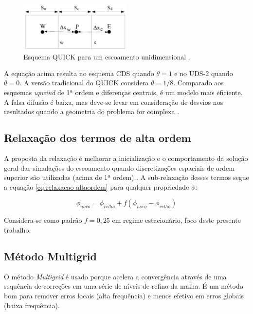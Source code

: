 \begin{figure}[!ht]
	\centering
	\includegraphics[width=0.5\textwidth]{foto03-quick-1d.png}  
	\caption[Esquema QUICK para um escoamento unidimensional.]{Esquema QUICK para um escoamento unidimensional \cite{fluent2021ansys}.}
	\label{fig:ansys-QUICK}
\end{figure}

A equação acima resulta no esquema CDS quando \(\theta = 1\) e no UDS-2 quando \(\theta = 0\). A versão tradicional do QUICK \cite{Leonard1979} considera \(\theta = 1/8\). Comparado aos esquemas \textit{upwind} de 1ª ordem e diferenças centrais, é um modelo mais eficiente. A falsa difusão é baixa, mas deve-se levar em consideração de desvios nos resultados quando a geometria do problema for complexa \cite{Leonard1979}.

\subsection{Relaxação dos termos de alta ordem}

A proposta da relaxação é melhorar a inicialização e o comportamento da solução geral das simulações do escoamento quando discretizações espaciais de ordem superior são utilizadas (acima de 1ª ordem) \cite{fluent2021ansys}. A sub-relaxação desses termos segue a equação \ref{eq:relaxacao-altaordem} para qualquer propriedade \(\phi\):

\begin{equation}
    \label{eq:relaxacao-altaordem}
    \phi_{novo} = \phi_{velho} + f(\phi_{novo} - \phi_{velho})
\end{equation}

Considera-se como padrão \(f = 0,25\) em regime estacionário, foco deste presente trabalho.

\subsection{Método Multigrid}

O método \textit{Multigrid} \cite{Hutchinson1986} é usado porque acelera a convergência através de uma sequência de correções em uma série de níveis de refino da malha. É um método bom para remover erros locais (alta frequência) e menos efetivo em erros globais (baixa frequência).

